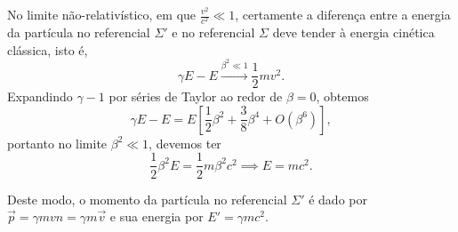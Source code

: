 No limite não-relativístico, em que \(\frac{v^2}{c^2} \ll 1\), certamente a diferença entre a energia da partícula no referencial \(\Sigma'\) e no referencial \(\Sigma\) deve tender à energia cinética clássica, isto é,
\begin{equation*}
    \gamma E - E \xrightarrow{\beta^2 \ll 1} \frac12 mv^2.
\end{equation*}
Expandindo \(\gamma - 1\) por séries de Taylor ao redor de \(\beta = 0\), obtemos
\begin{equation*}
    \gamma E - E = E \left[\frac12 \beta^2 + \frac38\beta^4 + O(\beta^6)\right],
\end{equation*}
portanto no limite \(\beta^2 \ll 1\), devemos ter
\begin{equation*}
    \frac12 \beta^2 E = \frac12 m\beta^2c^2 \implies E = mc^2.
\end{equation*}

Deste modo, o momento da partícula no referencial \(\Sigma'\) é dado por \(\vec{p} = \gamma m v \hat{n} = \gamma m \vec{v}\) e sua energia por \(E' = \gamma m c^2\).
